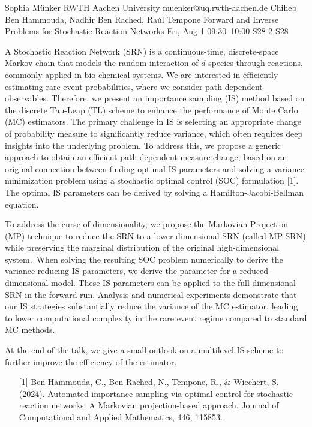 \begin{talk}
  {Sophia Münker}%
  {RWTH Aachen University}%
  {muenker@uq.rwth-aachen.de}%
  {Chiheb Ben Hammouda, Nadhir Ben Rached, Raúl Tempone}%
  {Forward and Inverse Problems for Stochastic Reaction Networks}%
  {}%
  {Fri, Aug 1 09:30–10:00}%
  {S28-2}%
  {S28}%
				
			
A Stochastic Reaction Network (SRN) is a continuous-time, discrete-space Markov chain that models the random interaction of $d$ species through reactions, commonly applied in bio-chemical systems. We are interested in efficiently estimating rare event probabilities, where we consider path-dependent observables. Therefore, we present an importance sampling (IS) method based on the discrete Tau-Leap (TL) scheme to enhance the performance of Monte Carlo (MC) estimators. The primary challenge in IS is selecting an appropriate change of probability measure to significantly reduce variance, which often requires deep insights into the underlying problem. To address this, we propose a generic approach to obtain an efficient path-dependent measure change, based on an original connection between finding optimal IS parameters and solving a variance minimization problem using a stochastic optimal control (SOC) formulation [1]. The optimal IS parameters can be derived by solving a Hamilton-Jacobi-Bellman equation.

To address the curse of dimensionality, we propose the Markovian Projection (MP) technique to reduce the SRN to a lower-dimensional SRN (called MP-SRN) while preserving the marginal distribution of the original high-dimensional system. When solving the resulting SOC problem numerically to derive the variance reducing IS parameters, we derive the parameter for a reduced-dimensional model. These IS parameters can be applied to the full-dimensional SRN in the forward run. Analysis and numerical experiments demonstrate that our IS strategies substantially reduce the variance of the MC estimator, leading to lower computational complexity in the rare event regime compared to standard MC methods. 

At the end of the talk, we give a small outlook on a multilevel-IS scheme to further improve the efficiency of the estimator.


\begin{enumerate}
   \item[{[1]}] Ben Hammouda, C., Ben Rached, N., Tempone, R., \& Wiechert, S. (2024). Automated importance sampling via optimal control for stochastic reaction networks: A Markovian projection-based approach. Journal of Computational and Applied Mathematics, 446, 115853.
\end{enumerate}

\medskip
\end{talk}

